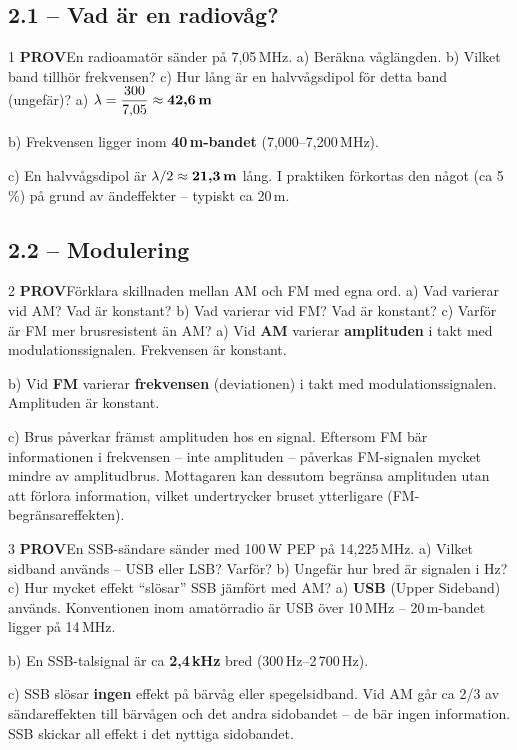 \documentclass[a4paper,11pt,twoside]{book}
\newcommand{\qprov}{\colorbox{redpale}{\textcolor{reddark}{\headingfont\bfseries\tiny PROV}}}
\begin{document}
\subsection*{2.1 – Vad är en radiovåg?}

\begin{facitblock}{1}
\qprov\quad En radioamatör sänder på 7,05\,MHz.
a) Beräkna våglängden.
b) Vilket band tillhör frekvensen?
c) Hur lång är en halvvågsdipol för detta band (ungefär)?
\tcblower
a) $\lambda = \dfrac{300}{7{,}05} \approx \textbf{42{,}6\,m}$

b) Frekvensen ligger inom \textbf{40\,m-bandet} (7,000--7,200\,MHz).

c) En halvvågsdipol är $\lambda/2 \approx \textbf{21{,}3\,m}$ lång.
I praktiken förkortas den något (ca 5\,\%) på grund av
ändeffekter -- typiskt ca 20\,m.
\end{facitblock}

\subsection*{2.2 – Modulering}

\begin{facitblock}{2}
\qprov\quad Förklara skillnaden mellan AM och FM med egna ord.
a) Vad varierar vid AM? Vad är konstant?
b) Vad varierar vid FM? Vad är konstant?
c) Varför är FM mer brusresistent än AM?
\tcblower
a) Vid \textbf{AM} varierar \textbf{amplituden} i takt med
modulationssignalen. Frekvensen är konstant.

b) Vid \textbf{FM} varierar \textbf{frekvensen} (deviationen)
i takt med modulationssignalen. Amplituden är konstant.

c) Brus påverkar främst amplituden hos en signal. Eftersom FM
bär informationen i frekvensen -- inte amplituden -- påverkas
FM-signalen mycket mindre av amplitudbrus. Mottagaren kan dessutom
begränsa amplituden utan att förlora information, vilket
undertrycker bruset ytterligare (FM-begränsareffekten).
\end{facitblock}

\begin{facitblock}{3}
\qprov\quad En SSB-sändare sänder med 100\,W PEP på 14,225\,MHz.
a) Vilket sidband används -- USB eller LSB? Varför?
b) Ungefär hur bred är signalen i Hz?
c) Hur mycket effekt ``slösar'' SSB jämfört med AM?
\tcblower
a) \textbf{USB} (Upper Sideband) används. Konventionen inom
amatörradio är USB över 10\,MHz -- 20\,m-bandet ligger på
14\,MHz.

b) En SSB-talsignal är ca \textbf{2,4\,kHz} bred (300\,Hz--2\,700\,Hz).

c) SSB slösar \textbf{ingen} effekt på bärvåg eller spegelsidband.
Vid AM går ca 2/3 av sändareffekten till bärvågen och det andra
sidobandet -- de bär ingen information. SSB skickar all effekt
i det nyttiga sidobandet.
\end{facitblock}
\end{document}

